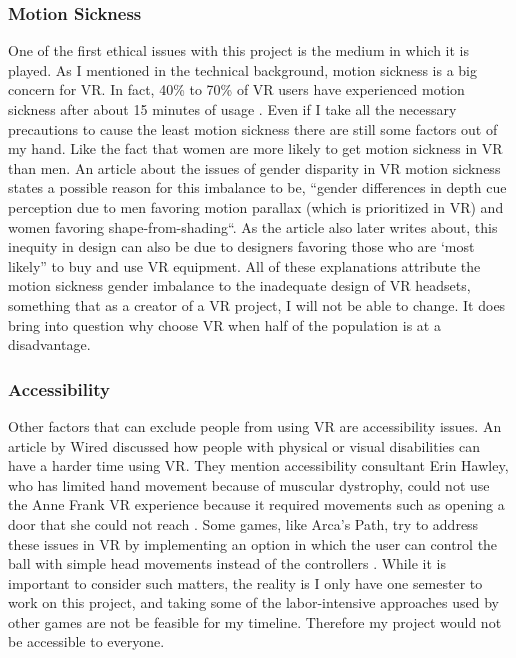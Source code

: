 \documentclass[10pt,twocolumn]{article}
\begin{document}
\subsubsection{Motion Sickness}
One of the first ethical issues with this project is the medium in which it is played. As I mentioned in the technical background, motion sickness is a big concern for VR. In fact, 40\% to 70\% of VR users have experienced motion sickness after about 15 minutes of usage \cite{motionsicknessvr2019}. Even if I take all the necessary precautions to cause the least motion sickness there are still some factors out of my hand. Like the fact that women are more likely to get motion sickness in VR than men. An article about the issues of gender disparity in VR motion sickness states a possible reason for this imbalance to be, “gender differences in depth cue perception due to men favoring motion parallax (which is prioritized in VR) and women favoring shape-from-shading“\cite{vrbarriers2018}. As the article also later writes about, this inequity in design can also be due to designers favoring those who are ‘most likely” to buy and use VR equipment\cite{vrbarriers2018}. All of these explanations attribute the motion sickness gender imbalance to the inadequate design of VR headsets, something that as a creator of a VR project, I will not be able to change. It does bring into question why choose VR when half of the population is at a disadvantage. 

\subsubsection{Accessibility}
Other factors that can exclude people from using VR are accessibility issues. An article by Wired discussed how people with physical or visual disabilities can have a harder time using VR. They mention accessibility consultant Erin Hawley, who has limited hand movement because of muscular dystrophy, could not use the Anne Frank VR experience because it required movements such as opening a door that she could not reach \cite{vraccessibility2022}. Some games, like Arca’s Path, try to address these issues in VR by implementing an option in which the user can control the ball with simple head movements instead of the controllers \cite{arcaspath2018}. While it is important to consider such matters, the reality is I only have one semester to work on this project, and taking some of the labor-intensive approaches used by other games are not be feasible for my timeline. Therefore my project would not be accessible to everyone.
\end{document}

